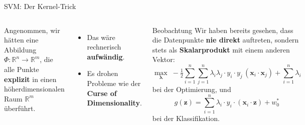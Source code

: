 \begin{frame}{SVM: Der Kernel-Trick}
  \footnotesize
\begin{columns}
Angenommen, wir hätten eine Abbildung
$\Phi: \mathbb{R}^n \to \mathbb{R}^m$, die alle Punkte \textbf{explizit} in
einen höherdimensionalen Raum $\mathbb{R}^m$ überführt.

\vspace{0.4em}
\begin{itemize}
  \item Das wäre rechnerisch \textbf{aufwändig}.
  \item Es drohen Probleme wie der \textbf{Curse of Dimensionality}.
\end{itemize}

\begin{block}{\footnotesize Beobachtung}
Wir haben bereits gesehen, dass die Datenpunkte \textbf{nie direkt} auftreten, sondern stets
als \textbf{Skalarprodukt} mit einem anderen Vektor:
\[
  \max_{\boldsymbol{\lambda}} \; -\tfrac{1}{2}\sum_{i=1}^{n}\sum_{j=1}^{n}
  \lambda_i \lambda_j \cdot y_i \cdot y_j\,(\mathbf{x}_i\!\cdot\mathbf{x}_j)
  + \sum_{i=1}^{n}\lambda_i
\]
bei der Optimierung, und
\[
   g(\mathbf{z}) = \sum_{i=1}^{n}\lambda_i \cdot y_i\cdot 
          (\mathbf{x}_i\!\cdot\mathbf{z}) + w_0^{*}
\]
bei der Klassifikation.
\end{block}

\end{columns}
\end{frame}

